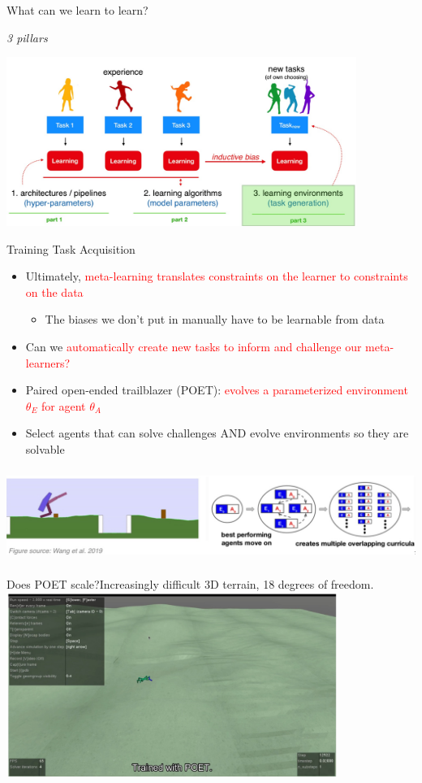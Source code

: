 \documentclass[aspectratio=169,t,handout,xcolor={usenames,dvipsnames}]{beamer}
\begin{document}
\begin{frame}{What can we learn to learn?}
    \centerline{\textit{3 pillars}}
    \centering\includegraphics[height=5.5cm]{image/Jietu20220329-014300.jpg}
\end{frame}
\begin{frame}{Training Task Acquisition}
    \begin{itemize}
        \item Ultimately, \textcolor{red}{meta-learning translates constraints on the learner to constraints on the data}
        \begin{itemize}
            \item The biases we don’t put in manually have to be learnable from data
        \end{itemize}
        \item Can we \textcolor{red}{automatically create new tasks to inform and challenge our meta-learners?} 
        \item Paired open-ended trailblazer (POET): \textcolor{red}{evolves a parameterized environment $\theta_E$ for agent $\theta_A$ }
        \item Select agents that can solve challenges AND evolve environments so they are solvable
    \end{itemize}
    \centering\includegraphics[height=3cm]{image/Jietu20220329-014755.jpg}
\end{frame}

\begin{frame}{Does POET scale?}{Increasingly difficult 3D terrain, 18 degrees of freedom.}
    \centering\includegraphics[height=6cm]{image/Jietu20220329-015021.jpg}
\end{frame}
\end{document}
